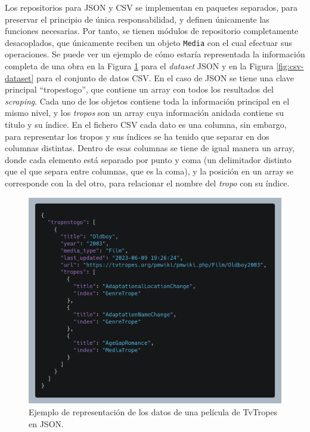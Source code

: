 Los repositorios para JSON y CSV se implementan en paquetes separados, para
preservar el principio de única responsabilidad, y definen únicamente las
funciones necesarias. Por tanto, se tienen módulos de repositorio completamente
desacoplados, que únicamente reciben un objeto \texttt{Media} con el cual
efectuar sus operaciones. Se puede ver un ejemplo de cómo estaría representada
la información completa de una obra en la Figura \ref{fig:json-dataset} para el
\textit{dataset} JSON y en la Figura \ref{fig:csv-dataset} para el conjunto de
datos CSV. En el caso de JSON se tiene una clave principal ``tropestogo'', que
contiene un array con todos los resultados del \textit{scraping}. Cada uno de
los objetos contiene toda la información principal en el mismo nivel, y los
\textit{tropos} son un array cuya información anidada contiene su título y su
índice. En el fichero CSV cada dato es una columna, sin embargo, para
representar los tropos y sus índices se ha tenido que separar en dos columnas
distintas. Dentro de esas columnas se tiene de igual manera un array, donde cada
elemento está separado por punto y coma (un delimitador distinto que el que
separa entre columnas, que es la coma), y la posición en un array se corresponde
con la del otro, para relacionar el nombre del \textit{tropo} con su índice.

\begin{figure}[ht]
    \includegraphics[width=\textwidth]{img/dataset-json.png}
    \caption{Ejemplo de representación de los datos de una película de TvTropes en JSON.}
    \label{fig:json-dataset}
\end{figure}

